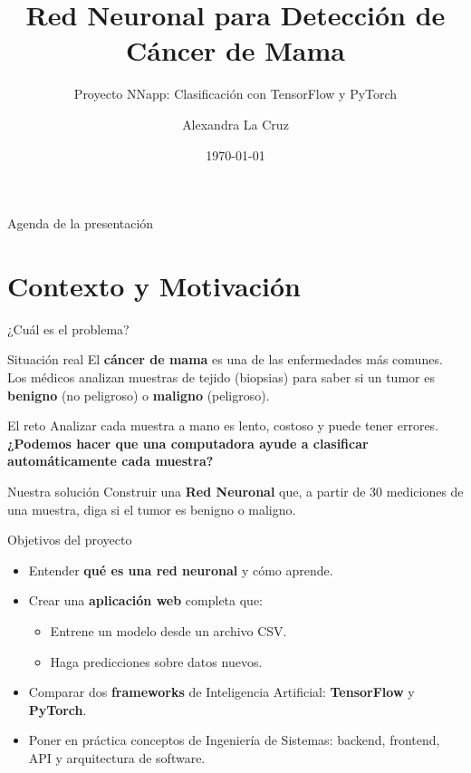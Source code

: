 \documentclass[10pt,aspectratio=169]{beamer}
\title{Red Neuronal para Detección de Cáncer de Mama}
\subtitle{Proyecto NNapp: Clasificación con TensorFlow y PyTorch}
\author{Alexandra La Cruz}
\date{\today}
\institute{Ingeniería de Sistemas}
\begin{document}
\begin{frame}
  \titlepage
\end{frame}

\begin{frame}{Agenda de la presentación}
  \tableofcontents
\end{frame}

\section{Contexto y Motivación}

\begin{frame}{¿Cuál es el problema?}
  \begin{block}{Situación real}
    El \textbf{cáncer de mama} es una de las enfermedades más comunes.
    Los médicos analizan muestras de tejido (biopsias) para saber si un
    tumor es \textbf{benigno} (no peligroso) o \textbf{maligno} (peligroso).
  \end{block}

  \pause

  \begin{alertblock}{El reto}
    Analizar cada muestra a mano es lento, costoso y puede tener errores.
    \textbf{¿Podemos hacer que una computadora ayude a clasificar
    automáticamente cada muestra?}
  \end{alertblock}

  \pause

  \begin{exampleblock}{Nuestra solución}
    Construir una \textbf{Red Neuronal} que, a partir de 30 mediciones
    de una muestra, diga si el tumor es benigno o maligno.
  \end{exampleblock}
\end{frame}

\begin{frame}{Objetivos del proyecto}
  \begin{itemize}
    \item Entender \textbf{qué es una red neuronal} y cómo aprende.
    \item Crear una \textbf{aplicación web} completa que:
      \begin{itemize}
        \item Entrene un modelo desde un archivo CSV.
        \item Haga predicciones sobre datos nuevos.
      \end{itemize}
    \item Comparar dos \textbf{frameworks} de Inteligencia Artificial:
      \textbf{TensorFlow} y \textbf{PyTorch}.
    \item Poner en práctica conceptos de Ingeniería de Sistemas:
      backend, frontend, API y arquitectura de software.
  \end{itemize}
\end{frame}
\end{document}
